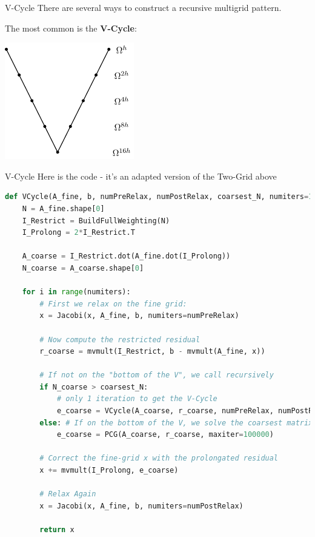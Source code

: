 \documentclass[11pt]{beamer}
\begin{document}
\begin{frame}{V-Cycle}
  There are several ways to construct a recursive multigrid pattern.

  The most common is the \textbf{V-Cycle}:
  \begin{center}
    \includegraphics[height=2in]{../Graphics/V-Cycle-Graphic.png}
  \end{center}
\end{frame}
\begin{frame}[fragile]{V-Cycle}
  Here is the code - it's an adapted version of the Two-Grid above
\begin{lstlisting}[language=Python]
def VCycle(A_fine, b, numPreRelax, numPostRelax, coarsest_N, numiters=1):
    N = A_fine.shape[0]
    I_Restrict = BuildFullWeighting(N)
    I_Prolong = 2*I_Restrict.T
    
    A_coarse = I_Restrict.dot(A_fine.dot(I_Prolong))
    N_coarse = A_coarse.shape[0]
    
    for i in range(numiters):
        # First we relax on the fine grid:
        x = Jacobi(x, A_fine, b, numiters=numPreRelax)
    
        # Now compute the restricted residual
        r_coarse = mvmult(I_Restrict, b - mvmult(A_fine, x))
    
        # If not on the "bottom of the V", we call recursively
        if N_coarse > coarsest_N:
            # only 1 iteration to get the V-Cycle
            e_coarse = VCycle(A_coarse, r_coarse, numPreRelax, numPostRelax, coarsest_N, 1)
        else: # If on the bottom of the V, we solve the coarsest matrix exactly
            e_coarse = PCG(A_coarse, r_coarse, maxiter=100000)
    
        # Correct the fine-grid x with the prolongated residual
        x += mvmult(I_Prolong, e_coarse)
    
        # Relax Again
        x = Jacobi(x, A_fine, b, numiters=numPostRelax)
    
        return x
\end{lstlisting}
  \end{frame}
\end{document}
